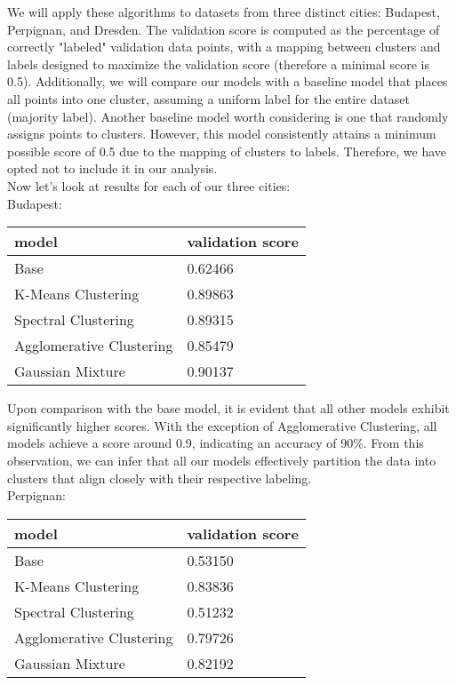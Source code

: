 \documentclass[a4paper]{article}
\begin{document}
	We will apply these algorithms to datasets from three distinct cities: Budapest, Perpignan, and Dresden. The validation score is computed as the percentage of correctly "labeled" validation data points, with a mapping between clusters and labels designed to maximize the validation score (therefore a minimal score is 0.5). Additionally, we will compare our models with a baseline model that places all points into one cluster, assuming a uniform label for the entire dataset (majority label). Another baseline model worth considering is one that randomly assigns points to clusters. However, this model consistently attains a minimum possible score of 0.5 due to the mapping of clusters to labels. Therefore, we have opted not to include it in our analysis.
	\\
	
	Now let's look at results for each of our three cities:
	\\
	
	Budapest:
	\begin{table}[!h]
		\begin{tabular}{|l|l|}
			\hline
			model &  validation score  \\ \hline
			Base & 0.62466 \\ \hline
			K-Means Clustering & 0.89863 \\ \hline
			Spectral Clustering &  0.89315 \\ \hline
			Agglomerative Clustering  &  0.85479 \\ \hline
			Gaussian Mixture &  0.90137 \\ \hline
		\end{tabular}
	\end{table} 

	Upon comparison with the base model, it is evident that all other models exhibit significantly higher scores. With the exception of Agglomerative Clustering, all models achieve a score around 0.9, indicating an accuracy of 90\%. From this observation, we can infer that all our models effectively partition the data into clusters that align closely with their respective labeling.
	\\
	
	Perpignan:
	\begin{table}[!h]
		\begin{tabular}{|l|l|}
			\hline
			model &  validation score  \\ \hline
			Base & 0.53150 \\ \hline
			K-Means Clustering & 0.83836 \\ \hline
			Spectral Clustering &  0.51232 \\ \hline
			Agglomerative Clustering  &  0.79726 \\ \hline
			Gaussian Mixture &  0.82192 \\ \hline
		\end{tabular}
	\end{table} 
\end{document}
